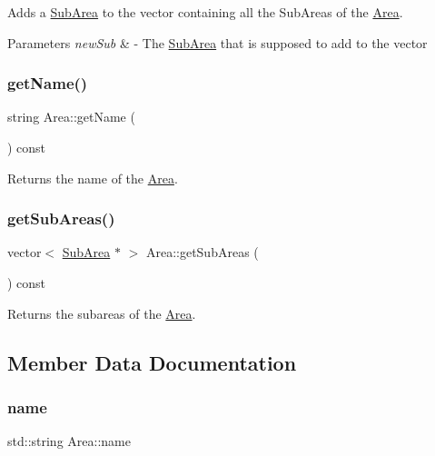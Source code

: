 Adds a \hyperlink{classSubArea}{Sub\+Area} to the vector containing all the Sub\+Areas of the \hyperlink{classArea}{Area}. 


\begin{DoxyParams}{Parameters}
{\em new\+Sub} & -\/ The \hyperlink{classSubArea}{Sub\+Area} that is supposed to add to the vector \\
\hline
\end{DoxyParams}
\mbox{\label{classArea_acdbc3527be262d1ea1b9c961e823257f}} 
\subsubsection{\texorpdfstring{get\+Name()}{getName()}}
{\footnotesize\ttfamily string Area\+::get\+Name (\begin{DoxyParamCaption}{ }\end{DoxyParamCaption}) const}



Returns the name of the \hyperlink{classArea}{Area}. 

\mbox{\label{classArea_abf3bfb978d0a7d05fe2cbbad9ce7fef4}} 
\subsubsection{\texorpdfstring{get\+Sub\+Areas()}{getSubAreas()}}
{\footnotesize\ttfamily vector$<$ \hyperlink{classSubArea}{Sub\+Area} $\ast$ $>$ Area\+::get\+Sub\+Areas (\begin{DoxyParamCaption}{ }\end{DoxyParamCaption}) const}



Returns the subareas of the \hyperlink{classArea}{Area}. 



\subsection{Member Data Documentation}
\mbox{\label{classArea_a24201719de9d9dfef7a720c036529dd7}} 
\subsubsection{\texorpdfstring{name}{name}}
{\footnotesize\ttfamily std\+::string Area\+::name\hspace{0.3cm}{\ttfamily [private]}}




